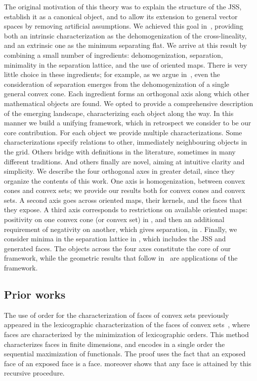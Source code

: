 \documentclass{article}
\theoremstyle{plain}
\theoremstyle{definition}
\theoremstyle{remark}
\begin{document}
The original motivation of this theory was to explain the structure of the JSS, establish it as a canonical object, and to allow its extension to 
general vector spaces by removing artificial assumptions. We achieved this goal in~, providing both an intrinsic characterization as the dehomogenization of the cross-lineality, and an extrinsic one as the minimum separating flat. We arrive at this result
by combining a small number of ingredients: dehomogenization, separation, minimality in the separation lattice, and the use of oriented maps. There is very little choice in these ingredients; for example, as we argue in~, even the consideration of separation emerges from the dehomogenization of a single general convex cone.  
Each ingredient forms an orthogonal axis along which other mathematical objects are found. We opted to provide a comprehensive description of the emerging landscape, characterizing each object along the way. In this manner we build a unifying framework, which in retrospect we consider to be our core contribution. 
For each object we provide multiple characterizations. Some characterizations specify relations to other, immediately neighbouring objects in the grid. Others bridge with definitions in the literature, sometimes in many different traditions. And others finally are novel, aiming at intuitive clarity and simplicity.
We describe the four orthogonal axes in greater detail, since they organize the contents of this work. 
One axis is homogenization, between convex cones and convex sets; we provide our results both for convex cones and convex sets. A second axis goes across oriented maps, their kernels, and the faces that they expose.
A third axis corresponds to restrictions on available
oriented maps: positivity on one convex cone (or convex set) in , and then an additional
requirement of negativity on another, which gives separation, in . 
Finally, we consider minima in the separation lattice in , which includes the JSS and generated faces.
The objects across the four axes constitute the core of our framework, 
while the geometric results that follow in~ are applications of the framework.
\subsection{Prior works}
\label{loc:intro_prose_order_convex_sets.concise_attack.prior_works}
The use of order for the characterization of faces of convex sets 
previously appeared in the lexicographic characterization of the faces of convex sets~\cite{martinez-legaz_LEXICOGRAPHICALCHARACTERIZATIONFACES_}, where faces are characterized by the minimization of lexicographic orders. This method characterizes faces in finite dimensions, and encodes in a single order the sequential maximization of functionals.
The proof uses the fact that an exposed face of an exposed face is a face. \textcite{martinez-legaz_LEXICOGRAPHICALCHARACTERIZATIONFACES_} moreover shows that any face is attained by this recursive procedure.
\end{document}
